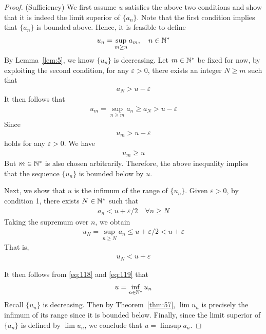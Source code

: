 \documentclass[thmcnt=section, 12pt]{my-elegantbook}
\begin{document}
\begin{proof}
    (Sufficiency) We first assume $u$ satisfies the above two conditions and show that it is indeed the limit superior of $\{a_n\}$. Note that the first condition implies that $\{a_n\}$ is bounded above. Hence, it is feasible to define
    \begin{align*}
        u_n = \sup_{m \geq n} a_m,
        \quad n \in \mathbb{N}^\ast
    \end{align*}
    By Lemma~\ref{lem:5}, we know $\{u_n\}$ is decreasing. Let $m \in \mathbb{N}^\ast$ be fixed for now, by exploiting the second condition, for any $\varepsilon > 0$, there exists an integer $N \geq m$ such that
    \begin{align*}
        a_N > u - \varepsilon
    \end{align*}
    It then follows that
    \begin{align*}
        u_m = \sup_{n \geq m} a_n
        \geq a_N
        > u - \varepsilon
    \end{align*}
    Since
    \begin{align*}
        u_m > u - \varepsilon
    \end{align*}
    holds for any $\varepsilon > 0$. We have
    \begin{align}
        u_m \geq u
        \label{eq:118}
    \end{align}
    But $m \in \mathbb{N}^\ast$ is also chosen arbitrarily. Therefore, the above inequality implies that the sequence $\{u_n\}$ is bounded below by $u$.

    Next, we show that $u$ is the infimum of the range of $\{u_n\}$. Given $\varepsilon > 0$, by condition 1, there exists $N \in \mathbb{N}^\ast$ such that
    \begin{align*}
        a_n < u + \varepsilon/2
        \quad \forall n \geq N
    \end{align*}
    Taking the supremum over $n$, we obtain
    \begin{align*}
        u_N = \sup_{n \geq N} a_n
        \leq u + \varepsilon/2
        < u + \varepsilon
    \end{align*}
    That is,
    \begin{align}
        u_N < u + \varepsilon
        \label{eq:119}
    \end{align}

    It then follows from \eqref{eq:118} and \eqref{eq:119} that
    \begin{align*}
        u = \inf_{n \in \mathbb{N}^\ast} u_n
    \end{align*}
    Recall $\{u_n\}$ is decreasing. Then by Theorem~\ref{thm:57}, $\lim u_n$ is precisely the infimum of its range since it is bounded below. Finally, since the limit superior of $\{a_n\}$ is defined by $\lim u_n$, we conclude that $u = \limsup a_n$.


\end{proof}
\end{document}
